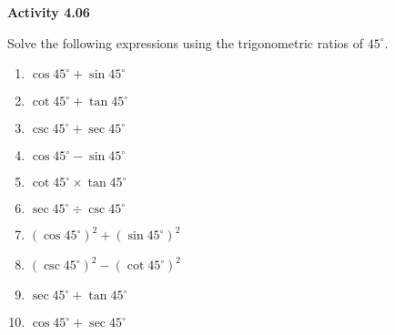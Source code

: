 \vspace{0.3ex}
\noindent\textbf{Activity 4.06}

\vspace{0.2ex}

Solve the following expressions using the trigonometric ratios of \( 45^\circ \).
\begin{multicols}{2}
\begin{enumerate}
    \item \( \cos 45^\circ + \sin 45^\circ \)
    \item \( \cot 45^\circ + \tan 45^\circ \)
    \item \( \csc 45^\circ + \sec 45^\circ \)
    \item \( \cos 45^\circ - \sin 45^\circ \)
    \item \( \cot 45^\circ \times \tan 45^\circ \)
    \item \( \sec 45^\circ \div \csc 45^\circ \)
    \item \( (\cos 45^\circ)^2 + (\sin 45^\circ)^2 \)
    \item \( (\csc 45^\circ)^2 - (\cot 45^\circ)^2 \)
    \item \( \sec 45^\circ + \tan 45^\circ \)
    \item \( \cos 45^\circ + \sec 45^\circ \)
\end{enumerate}
\end{multicols}

